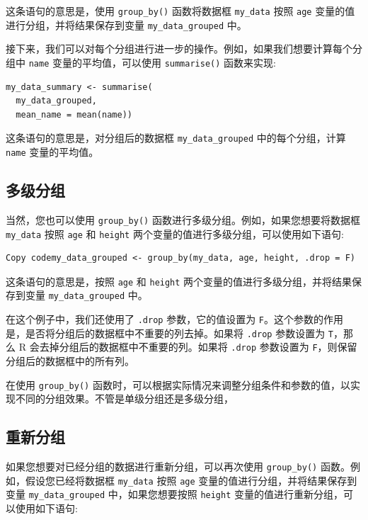 \documentclass[
  letterpaper,
  DIV=11,
  numbers=noendperiod]{scrreprt}
\begin{document}
这条语句的意思是，使用 \texttt{group\_by()} 函数将数据框
\texttt{my\_data} 按照 \texttt{age} 变量的值进行分组，并将结果保存到变量
\texttt{my\_data\_grouped} 中。

接下来，我们可以对每个分组进行进一步的操作。例如，如果我们想要计算每个分组中
\texttt{name} 变量的平均值，可以使用 \texttt{summarise()} 函数来实现:

\begin{verbatim}
my_data_summary <- summarise(
  my_data_grouped, 
  mean_name = mean(name))
\end{verbatim}

这条语句的意思是，对分组后的数据框 \texttt{my\_data\_grouped}
中的每个分组，计算 \texttt{name} 变量的平均值。

\hypertarget{ux591aux7ea7ux5206ux7ec4}{%
\subsection{多级分组}\label{ux591aux7ea7ux5206ux7ec4}}

当然，您也可以使用 \texttt{group\_by()}
函数进行多级分组。例如，如果您想要将数据框 \texttt{my\_data} 按照
\texttt{age} 和 \texttt{height}
两个变量的值进行多级分组，可以使用如下语句:

\begin{verbatim}
Copy codemy_data_grouped <- group_by(my_data, age, height, .drop = F)
\end{verbatim}

这条语句的意思是，按照 \texttt{age} 和 \texttt{height}
两个变量的值进行多级分组，并将结果保存到变量 \texttt{my\_data\_grouped}
中。

在这个例子中，我们还使用了 \texttt{.drop} 参数，它的值设置为
\texttt{F}。这个参数的作用是，是否将分组后的数据框中不重要的列去掉。如果将
\texttt{.drop} 参数设置为 \texttt{T}，那么 R
会去掉分组后的数据框中不重要的列。如果将 \texttt{.drop} 参数设置为
\texttt{F}，则保留分组后的数据框中的所有列。

在使用 \texttt{group\_by()}
函数时，可以根据实际情况来调整分组条件和参数的值，以实现不同的分组效果。不管是单级分组还是多级分组，

\hypertarget{ux91cdux65b0ux5206ux7ec4}{%
\subsection{重新分组}\label{ux91cdux65b0ux5206ux7ec4}}

如果您想要对已经分组的数据进行重新分组，可以再次使用
\texttt{group\_by()} 函数。例如，假设您已经将数据框 \texttt{my\_data}
按照 \texttt{age} 变量的值进行分组，并将结果保存到变量
\texttt{my\_data\_grouped} 中，如果您想要按照 \texttt{height}
变量的值进行重新分组，可以使用如下语句:
\end{document}
